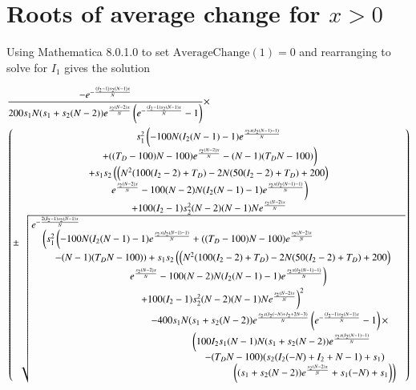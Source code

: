  \section{Roots of average change for $x>0$}
 \label{approots}
 Using Mathematica 8.0.1.0 to set $\text{AverageChange}(1)=0$ and rearranging to solve for $I_1$ gives the solution
 \begin{small}
 \begin{align}
 \label{lbr}
&\frac{-e^{-\frac{(I_2-1) s_2 (N-1) x}{N}} }{200 s_1 N (s_1+s_2 (N-2)) e^{\frac{s_2
   (N-2) x}{N}} \left(e^{-\frac{(I_2-1) s_2
   (N-1) x}{N}}-1\right)}\times \\
&\begin{pmatrix}
\begin{matrix}
s_1^2   \left(-100 N (I_2 (N-1)-1) e^{\frac{s_2 x   (I_2 (N-1)-1)}{N}} \right. \\
   \left. +((T_D-100) N-100)   e^{\frac{s_2 (N-2) x}{N}}-(N-1) (T_D   N-100)\right) \\
   +s_1 s_2 \left(\left(N^2 (100   (I_2-2)+T_D)-2 N (50 (I_2-2)+T_D)+200\right)\right. \\
  \left. e^{\frac{s_2 (N-2) x}{N}}-100 (N-2)   N (I_2 (N-1)-1) e^{\frac{s_2 x (I_2   (N-1)-1)}{N}}\right)\\
   +100 (I_2-1) s_2^2   (N-2) (N-1) N e^{\frac{s_2 (N-2)   x}{N}}
   \end{matrix} \\
\pm \sqrt{ \splitfrac{e^{-\frac{2 (I_2-1) s_2 (N-1)  x}{N}}}
{\splitfrac{ \left(s_1^2 \left(-100 N (I_2   (N-1)-1) e^{\frac{s_2 x (I_2   (N-1)-1)}{N}}+((T_D-100) N-100)   e^{\frac{s_2 (N-2) x}{N}}\right. \right. }
{\splitfrac{\left. -(N-1) (T_D N-100)\right)+s_1 s_2 \left(\left(N^2 (100   (I_2-2)+T_D)-2 N (50 (I_2-2)+T_D)+200\right) \right.}
{\splitfrac{   \left. e^{\frac{s_2 (N-2) x}{N}}-100 (N-2)   N (I_2 (N-1)-1) e^{\frac{s_2 x (I_2   (N-1)-1)}{N}}\right)}
{\splitfrac{\left. +100 (I_2-1) s_2^2   (N-2) (N-1) N e^{\frac{s_2 (N-2)   x}{N}}\right)^2}
{\splitfrac{-400 s_1 N (s_1+s_2   (N-2)) e^{\frac{s_2 x (I_2 (-N)+I_2+2   N-3)}{N}} \left(e^{-\frac{(I_2-1) s_2   (N-1) x}{N}}-1\right) \times}
{\splitfrac{ \left(100 I_2 s_1   (N-1) N (s_1+s_2 (N-2))   e^{\frac{s_2 x (I_2 (N-1)-1)}{N}}\right.}
{\splitfrac{\left.-(T_D   N-100) (s_2 (I_2   (-N)+I_2+N-1)+s_1)\right.}{\left. \left((s_1+s_2   (N-2)) e^{\frac{s_2 (N-2) x}{N}}+s_1   (-N)+s_1\right)\right)}}}}}}}}} 
\end{pmatrix} \notag
   \end{align}
   \end{small}
